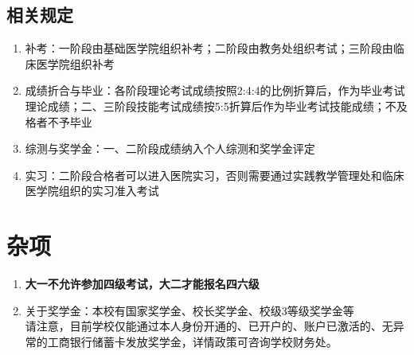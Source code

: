 \subsection[相关规定]{相关规定}
\begin{enumerate}
    \item 补考：一阶段由基础医学院组织补考；二阶段由教务处组织考试；三阶段由临床医学院组织补考
    \item 成绩折合与毕业：各阶段理论考试成绩按照2:4:4的比例折算后，作为毕业考试理论成绩；二、三阶段技能考试成绩按5:5折算后作为毕业考试技能成绩；不及格者不予毕业
    \item 综测与奖学金：一、二阶段成绩纳入个人综测和奖学金评定
    \item 实习：二阶段合格者可以进入医院实习，否则需要通过实践教学管理处和临床医学院组织的实习准入考试
\end{enumerate}

\section[杂项]{杂项}
\begin{enumerate}
    \item \textbf{大一不允许参加四级考试，大二才能报名四六级}
    \item 关于奖学金：本校有国家奖学金、校长奖学金、校级3等级奖学金等\\
          请注意，目前学校仅能通过本人身份开通的、已开户的、账户已激活的、无异常的工商银行储蓄卡发放奖学金，详情政策可咨询学校财务处。
\end{enumerate}